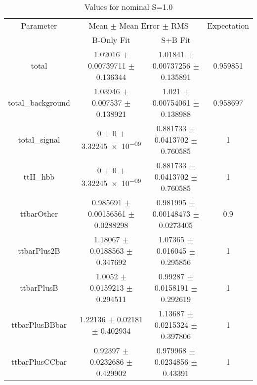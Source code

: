 \begin{table}
\centering
\caption{Values for nominal S=1.0}
\begin{tabular}{cccc}
\toprule
Parameter & \multicolumn{2}{c}{Mean $\pm$ Mean Error $\pm$ RMS} & Expectation\\
 & B-Only Fit & S+B Fit & \\
\midrule
total & \num{1.02016} $\pm$ \num{0.00739711} $\pm$ \num{0.136344} & \num{1.01841} $\pm$ \num{0.00737256} $\pm$ \num{0.135891} & \num{0.959851}\\
total\_background & \num{1.03946} $\pm$ \num{0.007537} $\pm$ \num{0.138921} & \num{1.021} $\pm$ \num{0.00754061} $\pm$ \num{0.138988} & \num{0.958697}\\
total\_signal & \num{0} $\pm$ \num{0} $\pm$ \num{3.32245e-09} & \num{0.881733} $\pm$ \num{0.0413702} $\pm$ \num{0.760585} & \num{1}\\
ttH\_hbb & \num{0} $\pm$ \num{0} $\pm$ \num{3.32245e-09} & \num{0.881733} $\pm$ \num{0.0413702} $\pm$ \num{0.760585} & \num{1}\\
ttbarOther & \num{0.985691} $\pm$ \num{0.00156561} $\pm$ \num{0.0288298} & \num{0.981995} $\pm$ \num{0.00148473} $\pm$ \num{0.0273405} & \num{0.9}\\
ttbarPlus2B & \num{1.18067} $\pm$ \num{0.0188563} $\pm$ \num{0.347692} & \num{1.07365} $\pm$ \num{0.016045} $\pm$ \num{0.295856} & \num{1}\\
ttbarPlusB & \num{1.0052} $\pm$ \num{0.0159213} $\pm$ \num{0.294511} & \num{0.99287} $\pm$ \num{0.0158191} $\pm$ \num{0.292619} & \num{1}\\
ttbarPlusBBbar & \num{1.22136} $\pm$ \num{0.02181} $\pm$ \num{0.402934} & \num{1.13687} $\pm$ \num{0.0215324} $\pm$ \num{0.397806} & \num{1}\\
ttbarPlusCCbar & \num{0.92397} $\pm$ \num{0.0232686} $\pm$ \num{0.429902} & \num{0.979968} $\pm$ \num{0.0234856} $\pm$ \num{0.43391} & \num{1}\\
\bottomrule
\end{tabular}
\end{table}
